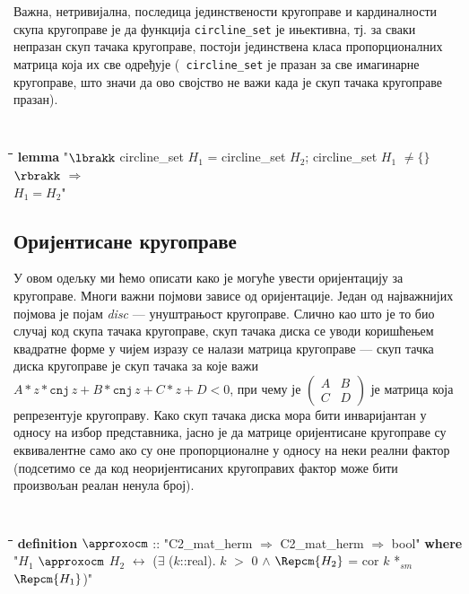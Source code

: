 Важна, нетривијална, последица јединствености кругоправе и
кардиналности скупа кругоправе је да функција {\tt circline\_set} је
ињективна, тј. за сваки непразан скуп тачака кругоправе, постоји
јединствена класа пропорционалних матрица која их све одређује ({\tt
  circline\_set} је празан за све имагинарне кругоправе, што значи да
ово својство не важи када је скуп тачака кругоправе празан).
{\tt
\begin{tabbing}
\hspace{5mm}\=\hspace{5mm}\=\hspace{5mm}\=\hspace{5mm}\=\hspace{5mm}\=\kill
{\bf lemma} "$\lbrakk$ circline\_set $H_1$ = circline\_set $H_2$; circline\_set $H_1$ $\neq \{\}$ $\rbrakk$ $\Longrightarrow$ \\
\>$H_1 = H_2$"
\end{tabbing}
}

\subsection{Оријентисане кругоправе}
\label{subsec:orientation}
У овом одељку ми ћемо описати како је могуће увести оријентацију за
кругоправе. Многи важни појмови зависе од оријентације.  Један од
најважнијих појмова је појам \emph{disc} --- унуштрањост
кругоправе. Слично као што је то био случај код скупа тачака
кругоправе, скуп тачака диска се уводи коришћењем квадратне форме у
чијем изразу се налази матрица кругоправе --- скуп тачка диска
кругоправе је скуп тачака за које важи $A*z*\mathtt{cnj}\,z +
B*\mathtt{cnj}\,z + C*z + D < 0$, при чему је
$\left(\begin{array}{cc}A & B\\C & D\end{array}\right)$ је матрица
  која репрезентује кругоправу. Како скуп тачака диска мора бити
  инваријантан у односу на избор представника, јасно је да матрице
  оријентисане кругоправе су еквивалентне само ако су оне
  пропорционалне у односу на неки реални фактор (подсетимо се да код
  неоријентисаних кругоправих фактор може бити произвољан реалан
  ненула број).

{\tt
\begin{tabbing}
\hspace{5mm}\=\hspace{5mm}\=\hspace{5mm}\=\hspace{5mm}\=\hspace{5mm}\=\kill
{\bf definition} $\approxocm$ :: "C2\_mat\_herm $\Rightarrow$ C2\_mat\_herm $\Rightarrow$ bool" {\bf where}\\
\>"$H_1$ $\approxocm$ $H_2$ $\longleftrightarrow$ ($\exists$ ($k$::real). $k$ $>$ 0 $\wedge$ $\Repcm{H_2}$ = cor $k$ *$_{sm}$ $\Repcm{H_1}$)"
\end{tabbing}
}

